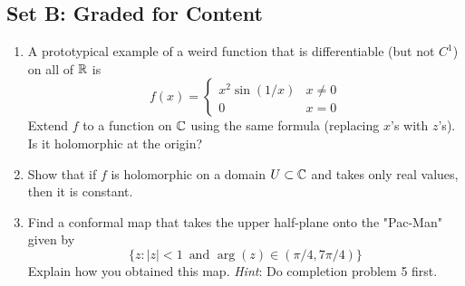 \documentclass[../psets.tex]{subfiles}
\begin{document}
\subsection*{Set B: Graded for Content}
\begin{enumerate}[label={\textbf{\arabic*.}}]
    \item A prototypical example of a weird function that is differentiable (but not $C^1$) on all of $\mathbb{R}$ is
    \begin{equation*}
        f(x) =
        \begin{cases}
            x^2\sin(1/x) & x\neq 0\\
            0 & x=0
        \end{cases}
    \end{equation*}
    Extend $f$ to a function on $\mathbb{C}$ using the same formula (replacing $x$'s with $z$'s). Is it holomorphic at the origin?
    \item Show that if $f$ is holomorphic on a domain $U\subset\mathbb{C}$ and takes only real values, then it is constant.
    \item Find a conformal map that takes the upper half-plane onto the "Pac-Man" given by
    \begin{equation*}
        \{z:|z|<1\,\text{ and }\arg(z)\in(\pi/4,7\pi/4)\}
    \end{equation*}
    Explain how you obtained this map. \emph{Hint}: Do completion problem 5 first.
\end{enumerate}
\end{document}

